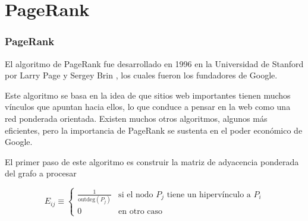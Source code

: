 \documentclass[xetex,mathserif,serif, 8pt]{beamer}
\begin{document}
\section{PageRank}

\begin{frame}
    \frametitle{PageRank}

    El algoritmo de PageRank fue desarrollado en 1996 en la Universidad de Stanford por Larry Page y Sergey Brin \cite{Brin_1998}, los cuales fueron los fundadores de Google.
    \vspace{0.5cm}

    Este algoritmo se basa en la idea de que sitios web importantes tienen muchos vínculos que apuntan hacia ellos, lo que conduce a pensar en la web como una red ponderada orientada. Existen muchos otros algoritmos, algunos más eficientes, pero la importancia de PageRank se sustenta en el poder económico de Google.
    \vspace{0.5cm}

    El primer paso de este algoritmo es construir la matriz de adyacencia ponderada del grafo a procesar

    \begin{equation}
        E_{ij} \equiv \begin{cases}
        \frac{1}{\mathrm{outdeg}(P_j)} & \text{si el nodo } P_j \text{ tiene un hipervínculo a } P_i \\
        0 & \text{en otro caso}
        \end{cases}
    \end{equation}
\end{frame}
\end{document}
